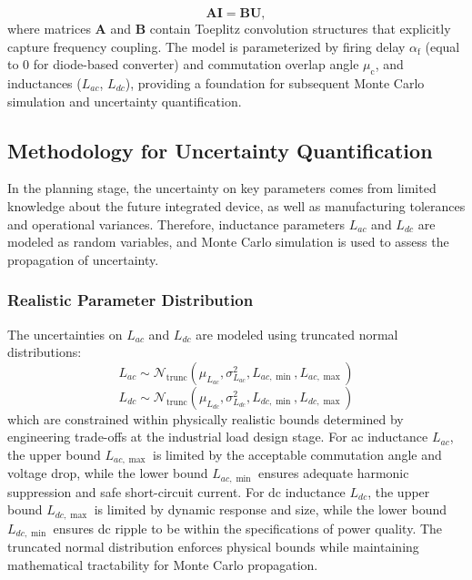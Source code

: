 \begin{equation}
\mathbf{A}\mathbf{I} = \mathbf{B}\mathbf{U},
\label{eq:HSS}
\end{equation}
where matrices $\mathbf{A}$ and $\mathbf{B}$ contain Toeplitz convolution structures that explicitly capture frequency coupling. The model is parameterized by firing delay $\alpha_{\text{f}}$ (equal to $0$ for diode-based converter) and commutation overlap angle $\mu_{\text{c}}$, and inductances ($L_{ac}$, $L_{dc}$), providing a foundation for subsequent Monte Carlo simulation and uncertainty quantification.

\subsection{Methodology for Uncertainty Quantification}
In the planning stage, the uncertainty on key parameters comes from limited knowledge about the future integrated device, as well as manufacturing tolerances and operational variances. Therefore, inductance parameters $L_{ac}$ and $L_{dc}$ are modeled as random variables, and Monte Carlo simulation is used to assess the propagation of uncertainty.

\subsubsection{Realistic Parameter Distribution}
The uncertainties on $L_{ac}$ and $L_{dc}$ are modeled using truncated normal distributions:
\begin{equation}
L_{ac} \sim \mathcal{N}_{\text{trunc}}(\mu_{L_{ac}}, \sigma_{L_{ac}}^2, L_{ac,\min}, L_{ac,\max})
\label{truncated_normal_lac}
\end{equation}
\begin{equation}
L_{dc} \sim \mathcal{N}_{\text{trunc}}(\mu_{L_{dc}}, \sigma_{L_{dc}}^2, L_{dc,\min}, L_{dc,\max})
\label{truncated_normal_ldc}
\end{equation}
which are constrained within physically realistic bounds determined by engineering trade-offs at the industrial load design stage. For ac inductance $L_{ac}$, the upper bound $L_{ac,\max}$ is limited by the acceptable commutation angle and voltage drop, while the lower bound $L_{ac,\min}$ ensures adequate harmonic suppression and safe short-circuit current. For dc inductance $L_{dc}$, the upper bound $L_{dc,\max}$ is limited by dynamic response and size, while the lower bound $L_{dc,\min}$ ensures dc ripple to be within the specifications of power quality. The truncated normal distribution enforces physical bounds while maintaining mathematical tractability for Monte Carlo propagation.

